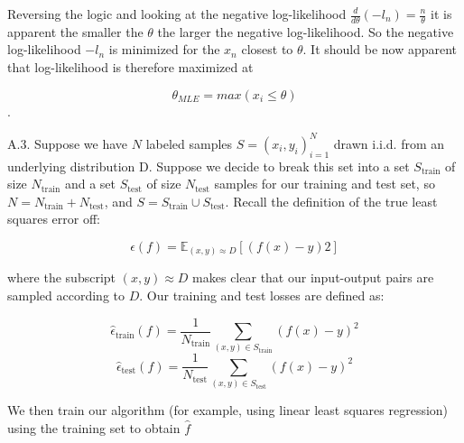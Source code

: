 \documentclass{article}
\newcommand{\1}{\mathbf{1}}
\newcommand{\E}{\mathbb{E}}
\begin{document}
Reversing the logic and looking at the negative log-likelihood $\frac{d}{d\theta}(-l_n)  = \frac{n}{\theta}$ it is apparent the smaller the $\theta$ the larger the negative log-likelihood. So the negative log-likelihood $-l_n$ is minimized for the $x_n$ closest to $\theta$. It should be now apparent that log-likelihood is therefore maximized at 

$$\theta_{MLE}=max(x_i \leq \theta)$$. 


\newpage
A.3.  Suppose we have $N$ labeled samples $S={(x_i,y_i)}^N_{i=1}$ drawn i.i.d. from an underlying distribution D. Suppose we decide to break this set into a set $S_\text{train}$ of size $N_\text{train}$ and a set $S_\text{test}$ of size $N_\text{test}$ samples for our training and test set, so $N = N_{\text{train}} + N_{\text{test}}$, and $S = S_{\text{train}} \cup S_{\text{test}}$.  Recall the definition of the true least squares error off:

$$\epsilon(f) = \E_{(x,y)\approx D}[(f(x)-y)2]$$

where the subscript $(x,y)\approx D$ makes clear that our input-output pairs are sampled according to $D$. Our training and test losses are defined as: 

$$\widehat\epsilon_{\text{train}}(f) = \frac{1}{N_\text{train}}\sum_{(x,y)\in S_\text{train}}(f(x)-y)^2$$
$$\widehat\epsilon_{\text{test}}(f) = \frac{1}{N_\text{test}}\sum_{(x,y)\in S_\text{test}}(f(x)-y)^2$$

We then train our algorithm (for example, using linear least squares regression) using the training set to obtain $\hat f$
\end{document}
